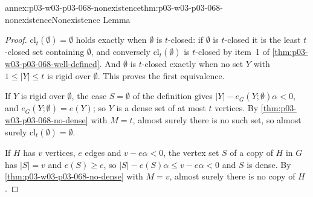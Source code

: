 \begin{annexitem}{annex:p03-w03-p03-068-nonexistence}{thm:p03-w03-p03-068-nonexistence}{Nonexistence Lemma}
\begin{proof}
\(\mathrm{cl}_t(\emptyset)=\emptyset\) holds exactly when \(\emptyset\) is
\(t\)-closed: if \(\emptyset\) is \(t\)-closed it is the least \(t\)-closed set
containing \(\emptyset\), and conversely \(\mathrm{cl}_t(\emptyset)\) is
\(t\)-closed by item~1 of \cref{thm:p03-w03-p03-068-well-defined}.  And
\(\emptyset\) is \(t\)-closed exactly when no set \(Y\) with
\(1\leq|Y|\leq t\) is rigid over \(\emptyset\).  This proves the first
equivalence.

If \(Y\) is rigid over \(\emptyset\), the case \(S=\emptyset\) of the
definition gives \(|Y|-e_G(Y;\emptyset)\alpha<0\), and
\(e_G(Y;\emptyset)=e(Y)\); so \(Y\) is a dense set of at most \(t\) vertices.
By \cref{thm:p03-w03-p03-068-no-dense} with \(M=t\), almost surely there is no
such set, so almost surely \(\mathrm{cl}_t(\emptyset)=\emptyset\).

If \(H\) has \(v\) vertices, \(e\) edges and \(v-e\alpha<0\), the vertex set
\(S\) of a copy of \(H\) in \(G\) has \(|S|=v\) and \(e(S)\geq e\), so
\(|S|-e(S)\alpha\leq v-e\alpha<0\) and \(S\) is dense.  By
\cref{thm:p03-w03-p03-068-no-dense} with \(M=v\), almost surely there is no
copy of \(H\).
\end{proof}
\end{annexitem}

